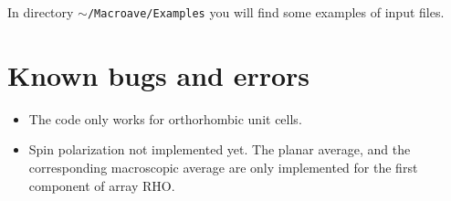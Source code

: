  In directory {\tt $\sim$/Macroave/Examples} you will find some
 examples of input files.

 \section{Known bugs and errors}

 \begin{itemize}
    \item The code only works for orthorhombic unit cells. 
    \item Spin polarization not implemented yet. 
          The planar average, and the corresponding macroscopic average
          are only implemented for the first component of array RHO.
 \end{itemize}


